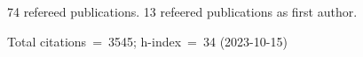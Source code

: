 74 refereed publications. 13 refeered publications as first author.

Total citations~=~3545; h-index~=~34 (2023-10-15)